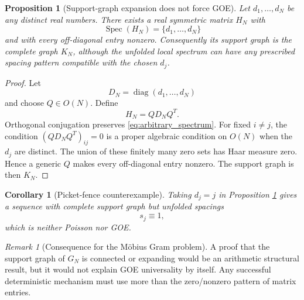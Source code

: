 \documentclass[11pt]{amsart}
\numberwithin{equation}{section}
\theoremstyle{plain}
\newtheorem{proposition}[theorem]{Proposition}
\newtheorem{corollary}[theorem]{Corollary}
\theoremstyle{definition}
\theoremstyle{remark}
\newtheorem{remark}[theorem]{Remark}
\newcommand{\Spec}{\operatorname{Spec}}
\newcommand{\diag}{\operatorname{diag}}
\begin{document}
\begin{proposition}[Support-graph expansion does not force GOE]
\label{prop:expansion_not_sufficient}
Let $d_1,\ldots,d_N$ be any distinct real numbers.  There exists a real symmetric matrix $H_N$ with
\begin{equation}
\Spec(H_N)=\{d_1,\ldots,d_N\}
\label{eq:arbitrary_spectrum}
\end{equation}
and with every off-diagonal entry nonzero.  Consequently its support graph is the complete graph $K_N$, although the unfolded local spectrum can have any prescribed spacing pattern compatible with the chosen $d_j$.
\end{proposition}

\begin{proof}
Let
\begin{equation}
D_N=\diag(d_1,\ldots,d_N)
\label{eq:diagonal_prescribed_spectrum}
\end{equation}
and choose $Q\in O(N)$.  Define
\begin{equation}
H_N=QD_NQ^T.
\label{eq:orthogonal_conjugate}
\end{equation}
Orthogonal conjugation preserves \eqref{eq:arbitrary_spectrum}.  For fixed $i\ne j$, the condition $(QD_NQ^T)_{ij}=0$ is a proper algebraic condition on $O(N)$ when the $d_j$ are distinct.  The union of these finitely many zero sets has Haar measure zero.  Hence a generic $Q$ makes every off-diagonal entry nonzero.  The support graph is then $K_N$.
\end{proof}

\begin{corollary}[Picket-fence counterexample]
\label{cor:picket_fence}
Taking $d_j=j$ in Proposition \ref{prop:expansion_not_sufficient} gives a sequence with complete support graph but unfolded spacings
\begin{equation}
s_j\equiv1,
\label{eq:picket_fence_spacing}
\end{equation}
which is neither Poisson nor GOE.
\end{corollary}

\begin{remark}[Consequence for the M\"obius Gram problem]
\label{rem:expansion_consequence}
A proof that the support graph of $G_N$ is connected or expanding would be an arithmetic structural result, but it would not explain GOE universality by itself.  Any successful deterministic mechanism must use more than the zero/nonzero pattern of matrix entries.
\end{remark}
\end{document}
